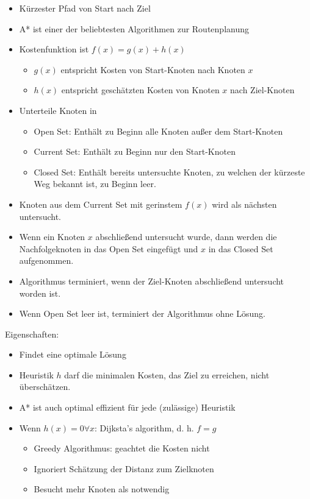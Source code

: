 \documentclass[paper=a4, fontsize=11pt]{scrartcl} %
\numberwithin{equation}{section} %
\numberwithin{figure}{section} %
\numberwithin{table}{section} %
\begin{document}
\begin{itemize}
\item Kürzester Pfad von Start nach Ziel
\item A* ist einer der beliebtesten Algorithmen zur Routenplanung
\item Kostenfunktion ist $f(x) = g(x) + h(x)$
\begin{itemize}
\item $g(x)$ entspricht Kosten von Start-Knoten nach Knoten $x$
\item $h(x)$ entspricht geschätzten Kosten von Knoten $x$ nach Ziel-Knoten
\end{itemize}
\item Unterteile Knoten in
\begin{itemize}
\item Open Set: Enthält zu Beginn alle Knoten außer dem Start-Knoten
\item Current Set: Enthält zu Beginn nur den Start-Knoten
\item Closed Set: Enthält bereits untersuchte Knoten, zu welchen der kürzeste Weg bekannt ist, zu Beginn leer.
\end{itemize}
\item Knoten aus dem Current Set mit gerinstem $f(x)$ wird als nächsten untersucht.
\item Wenn ein Knoten $x$ abschließend untersucht wurde, dann werden die Nachfolgeknoten in das Open Set eingefügt und $x$ in das Closed Set aufgenommen.
\item Algorithmus terminiert, wenn der Ziel-Knoten abschließend untersucht worden ist.
\item Wenn Open Set leer ist, terminiert der Algorithmus ohne Lösung.
\end{itemize}

Eigenschaften:
\begin{itemize}
\item Findet eine optimale Lösung
\item Heuristik $h$ darf die minimalen Kosten, das Ziel zu erreichen, nicht überschätzen.
\item A* ist auch optimal effizient für jede (zulässige) Heuristik
\item Wenn $h(x) = 0 \forall x$: Dijksta's algorithm, d. h. $f = g$
\begin{itemize}
\item Greedy Algorithmus: geachtet die Kosten nicht
\item Ignoriert Schätzung der Distanz zum Zielknoten
\item Besucht mehr Knoten als notwendig
\end{itemize}
\end{itemize}
\end{document}
